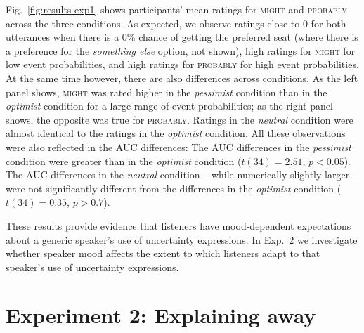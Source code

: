 Fig.~\ref{fig:results-exp1} shows participants' mean ratings for \textsc{might} and \textsc{probably} across the three conditions. As expected, we observe ratings close to 0 for both utterances when there is a 0\% chance of getting the preferred seat (where there is a preference for the \textit{something else} option, not shown), high ratings for \textsc{might} for low event probabilities, and high ratings for \textsc{probably} for high event probabilities. At the same time however, there are also differences across conditions. As the left panel shows, \textsc{might} was rated higher in the \textit{pessimist} condition than in the \textit{optimist} condition for a large range of event probabilities; as the right panel shows, the opposite was true for \textsc{probably}. Ratings in the \textit{neutral} condition were almost identical to the ratings in the \textit{optimist} condition. All these observations were also reflected in the AUC differences: The AUC differences in the \textit{pessimist} condition were greater than in the \textit{optimist} condition ($t(34)=2.51$, $p < 0.05$). The AUC differences in the \textit{neutral} condition -- while numerically slightly larger -- were not significantly different from the differences in the \textit{optimist} condition ($t(34)=0.35$, $p>0.7$).

These results provide evidence that listeners have mood-dependent expectations about a generic speaker's use of uncertainty expressions. In Exp.~2 we investigate whether  speaker mood affects the extent to which listeners adapt to that speaker's use of uncertainty expressions.  %



\section{Experiment 2: Explaining away}

